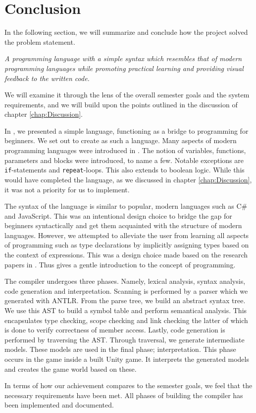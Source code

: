 \chapter{Conclusion}\label{chap:conclusion}

In the following section, we will summarize and conclude how the project solved the problem statement.

\vspace{5mm}
\textit{A programming language with a simple syntax which resembles that of modern programming languages while promoting practical learning and providing visual feedback to the written code.}
\vspace{5mm}

We will examine it through the lens of the overall semester goals and the system requirements, and we will build upon the points outlined in the discussion of chapter \ref{chap:Discussion}.

In , we presented a simple language, functioning as a bridge to programming for beginners. We set out to create \dazel{} as such a language.
Many aspects of modern programming languages were introduced in \dazel{}. The notion of variables, functions, parameters and blocks were introduced, to name a few. Notable exceptions are \texttt{if}-statements and \texttt{repeat}-loops. This also extends to boolean logic. While this would have completed the language, as we discussed in chapter \ref{chap:Discussion}, it was not a priority for us to implement. 

The syntax of the language is similar to popular, modern languages such as C\# and JavaScript.
This was an intentional design choice to bridge the gap for beginners syntactically and get them acquainted with the structure of modern languages. 
However, we attempted to alleviate the user from learning all aspects of programming such as type declarations by implicitly assigning types based on the context of expressions. 
This was a design choice made based on the research papers in . 
Thus \dazel{} gives a gentle introduction to the concept of programming.

The \dazel{} compiler undergoes three phases. Namely, lexical analysis, syntax analysis, code generation and interpretation. Scanning is performed by a parser which we generated with ANTLR. From the parse tree, we build an abstract syntax tree. We use this AST to build a symbol table and perform semantical analysis. This encapsulates type checking, scope checking and link checking the latter of which is done to verify correctness of member access. Lastly, code generation is performed by traversing the AST. Through traversal, we generate intermediate models. These models are used in the final phase; interpretation. This phase occurs in the \dazel{} game inside a built Unity game. It interprets the generated models and creates the game world based on these.

In terms of how our achievement compares to the semester goals, we feel that the necessary requirements have been met. All phases of building the compiler has been implemented and documented.